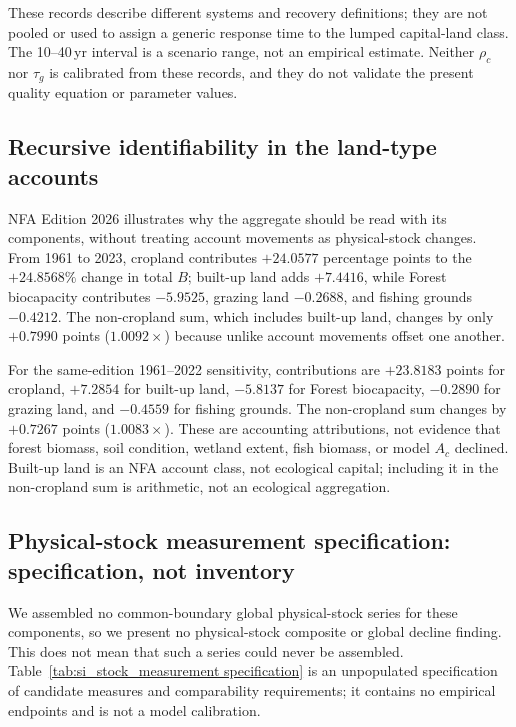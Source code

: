 \documentclass[11pt,a4paper]{article}
\begin{document}
These records describe different systems and recovery definitions; they are not pooled or used to assign a generic response time to the lumped capital-land class. The 10--40\,yr interval is a scenario range, not an empirical estimate. Neither $\rho_c$ nor $\tau_g$ is calibrated from these records, and they do not validate the present quality equation or parameter values.

\subsection{Recursive identifiability in the land-type accounts}\label{si:recursive}

NFA Edition 2026 illustrates why the aggregate should be read with its components, without treating account movements as physical-stock changes. From 1961 to 2023, cropland contributes $+24.0577$ percentage points to the $+24.8568\%$ change in total $B$; built-up land adds $+7.4416$, while Forest biocapacity contributes $-5.9525$, grazing land $-0.2688$, and fishing grounds $-0.4212$. The non-cropland sum, which includes built-up land, changes by only $+0.7990$ points ($1.0092\times$) because unlike account movements offset one another.

For the same-edition 1961--2022 sensitivity, contributions are $+23.8183$ points for cropland, $+7.2854$ for built-up land, $-5.8137$ for Forest biocapacity, $-0.2890$ for grazing land, and $-0.4559$ for fishing grounds. The non-cropland sum changes by $+0.7267$ points ($1.0083\times$). These are accounting attributions, not evidence that forest biomass, soil condition, wetland extent, fish biomass, or model $A_c$ declined. Built-up land is an NFA account class, not ecological capital; including it in the non-cropland sum is arithmetic, not an ecological aggregation.

\subsection{Physical-stock measurement specification: specification, not inventory}\label{si:stocks}

We assembled no common-boundary global physical-stock series for these components, so we present no physical-stock composite or global decline finding. This does not mean that such a series could never be assembled. Table~\ref{tab:si_stock_measurement specification} is an unpopulated specification of candidate measures and comparability requirements; it contains no empirical endpoints and is not a model calibration.
\end{document}
